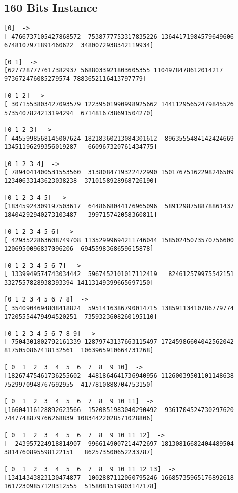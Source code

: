 \documentclass[a4paper]{article}
\begin{document}
\subsection{160 Bits Instance}
\begin{lstlisting}
[0]  -> 
[ 4766737105427868572  7538777753317835226 13644171984579649606  6748107971891460622  3480072938342119934]

[0 1]  -> 
[6277287777617382937 5688033921803605355 1104978478612014217  973672476085279574 7883652116413797779]

[0 1 2]  -> 
[ 3071553803427093579 12239501990998925662 14411295652479845526  5735407824213194294  6714816738691504270]

[0 1 2 3]  -> 
[ 4455998568145007624 18218360213084301612  8963555484142424669 13451196299356019287   660967320761434775]

[0 1 2 3 4]  -> 
[ 7894041400531553560  3138084719322472990 15017675162298246509 12340633143623038238  3710158928968726190]

[0 1 2 3 4 5]  -> 
[18345924309197503617  6448668044176965096  5891298758878861437 18404292940273103487   399715742058360811]

[0 1 2 3 4 5 6]  -> 
[ 4293522863608749708 11352999694211746044 15850245073570756600  1206950096837096206  6945598368659615878]

[0 1 2 3 4 5 6 7]  -> 
[ 1339949574743034442  5967452101017112419   824612579975542151  3327557828938393394 14113149399665697150]

[0 1 2 3 4 5 6 7 8]  -> 
[ 3540904694808418824  5951416386790014715 13859113410786779774 17205554479494520251  7359323608260195110]

[0 1 2 3 4 5 6 7 8 9]  -> 
[ 7504301802792161339 12879743137663115497 17245986604042562042  8175050867418132561  1063965910664731268]

[ 0  1  2  3  4  5  6  7  8  9 10]  -> 
[18267475461736255602  4481864641736940956 11260039501101148638  7529970948767692955  4177810888704753150]

[ 0  1  2  3  4  5  6  7  8  9 10 11]  -> 
[16604116128892623566  1520851983040290492  9361704524730297620  7447748879766268839 10834422028571028806]

[ 0  1  2  3  4  5  6  7  8  9 10 11 12]  -> 
[  243957224918814907  9966149007214472697 18130816682404489504  3814760895598122151   862573500652233787]

[ 0  1  2  3  4  5  6  7  8  9 10 11 12 13]  -> 
[13414343823130474877  1002887112060795246 16685735965176892618 16172309857128312555  5158081519803147178]


\end{lstlisting}
\end{document}
